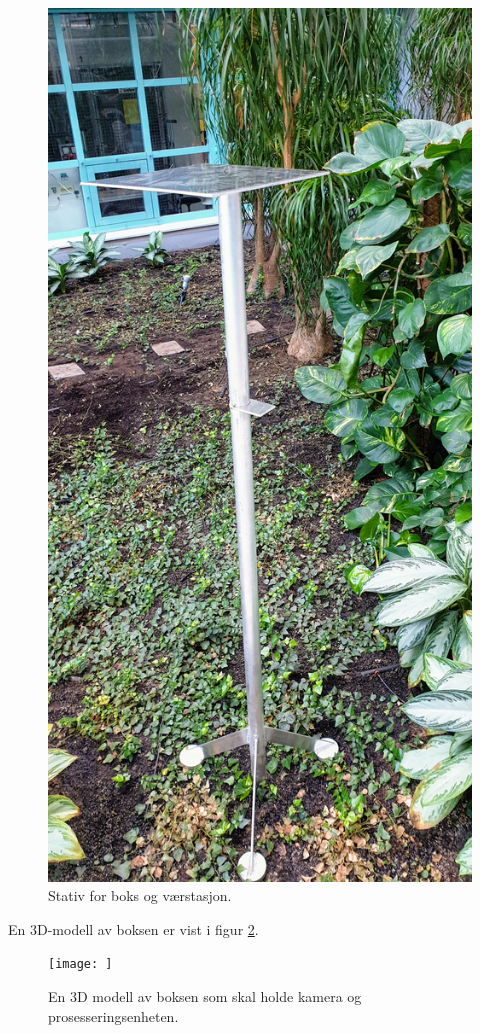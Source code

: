 \begin{figure}[H]
    \centering
    \includegraphics[width=.7\textwidth]{implementering/Stativ.jpg}
    \caption{Stativ for boks og værstasjon.}
    \label{fig:Stativ}
\end{figure}

En 3D-modell av boksen er vist i figur \ref{fig:boks}.
\begin{figure}[H]
    \centering
    \texttt{[image: ]}
    \caption{En 3D modell av boksen som skal holde kamera og prosesseringsenheten.}
    \label{fig:boks}
\end{figure}

